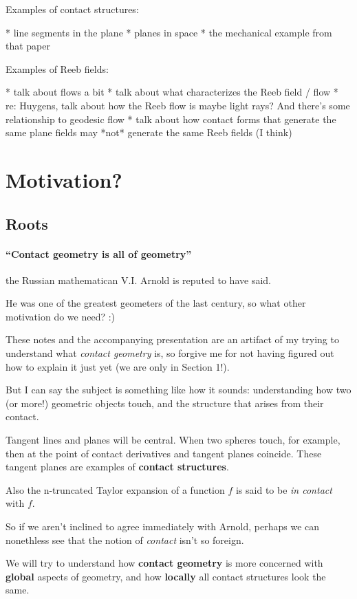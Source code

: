 \documentclass{article}
\begin{document}
Examples of contact structures:

* line segments in the plane
* planes in space
* the mechanical example from that paper

Examples of Reeb fields:

* talk about flows a bit
* talk about what characterizes the Reeb field / flow
* re: Huygens, talk about how the Reeb flow is maybe light rays? And there's
some relationship to geodesic flow
* talk about how contact forms that generate the same plane fields may *not*
generate the same Reeb fields (I think)

\section {Motivation?}

\subsection {Roots}

\paragraph{``Contact geometry is all of geometry''} the Russian mathematican
V.I. Arnold is reputed to have said.

He was one of the greatest geometers of the last century, so what other
motivation do we need? :)

These notes and the accompanying presentation are an artifact of my trying to
understand what \textsl{contact geometry} is, so forgive me for not having
figured out how to explain it just yet (we are only in Section 1!).

But I can say the subject is something like how it sounds: understanding how two
(or more!) geometric objects touch, and the structure that arises from their contact.

Tangent lines and planes will be central. When two spheres touch, for example,
then at the point of contact derivatives and tangent planes coincide. These tangent
planes are examples of \textbf{contact structures}.

Also the n-truncated Taylor expansion of a function $f$ is said to be \textsl{in
  contact} with $f$.

So if we aren't inclined to agree immediately with Arnold, perhaps we can nonethless see
that the notion of \textsl{contact} isn't so foreign.

We will try to understand how \textbf{contact geometry} is more concerned with
\textbf{global} aspects of geometry, and how \textbf{locally} all contact
structures look the same.
\end{document}
